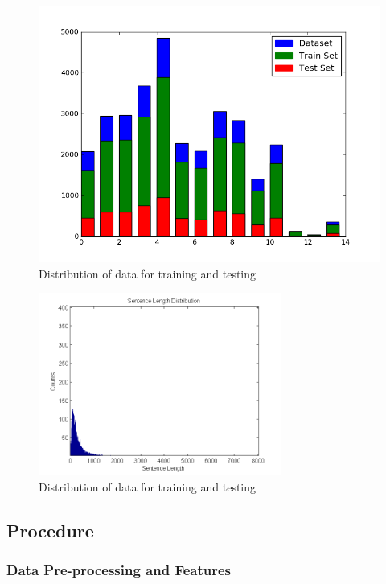 \documentclass[12pt]{article}
\begin{document}
\begin{figure}[h!]
\centering
\includegraphics[width=\textwidth]{figures/test_class_distribution.png}
\caption{Distribution of data for training and testing}\label{fig:dist}
\end{figure}

\begin{figure}[t]
\centering
\includegraphics[width=\textwidth,height=6cm]{figures/sentence_length.png}
\caption{Distribution of data for training and testing}\label{fig:sent_dist}
\end{figure}

\subsection{Procedure}\label{procedure}

\subsubsection{Data Pre-processing and Features}
\end{document}

